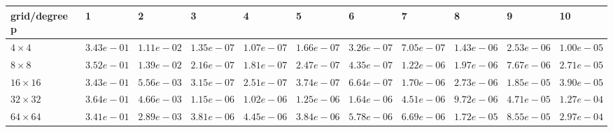 \begin{tabular}{lllllllllll}
\hline
 grid/degree p   & 1          & 2          & 3          & 4          & 5          & 6          & 7          & 8          & 9          & 10         \\
\hline
 $4 \times 4$    & $3.43e-01$ & $1.11e-02$ & $1.35e-07$ & $1.07e-07$ & $1.66e-07$ & $3.26e-07$ & $7.05e-07$ & $1.43e-06$ & $2.53e-06$ & $1.00e-05$ \\
 $8 \times 8$    & $3.52e-01$ & $1.39e-02$ & $2.16e-07$ & $1.81e-07$ & $2.47e-07$ & $4.35e-07$ & $1.22e-06$ & $1.97e-06$ & $7.67e-06$ & $2.71e-05$ \\
 $16 \times 16$  & $3.43e-01$ & $5.56e-03$ & $3.15e-07$ & $2.51e-07$ & $3.74e-07$ & $6.64e-07$ & $1.70e-06$ & $2.73e-06$ & $1.85e-05$ & $3.90e-05$ \\
 $32 \times 32$  & $3.64e-01$ & $4.66e-03$ & $1.15e-06$ & $1.02e-06$ & $1.25e-06$ & $1.64e-06$ & $4.51e-06$ & $9.72e-06$ & $4.71e-05$ & $1.27e-04$ \\
 $64 \times 64$  & $3.41e-01$ & $2.89e-03$ & $3.81e-06$ & $4.45e-06$ & $3.84e-06$ & $5.78e-06$ & $6.69e-06$ & $1.72e-05$ & $8.55e-05$ & $2.97e-04$ \\
\hline
\end{tabular}
